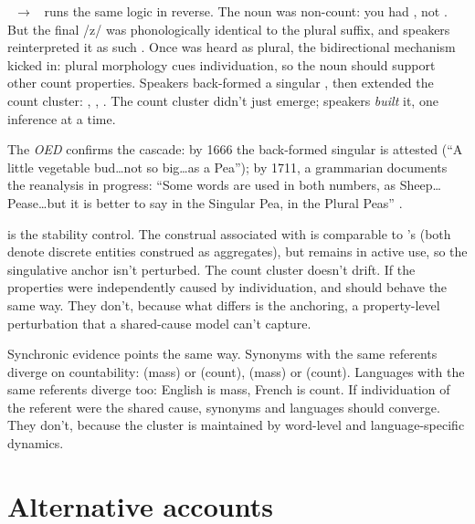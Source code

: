 \documentclass[12pt,a4paper]{article}
\begin{document}
~$\to$~ runs the same logic in reverse. The noun was non-count: you had , not . But the final /z/ was phonologically identical to the plural suffix, and speakers reinterpreted it as such \citep[s.v.\ , \textit{n.\textsuperscript{1}}]{oed}. Once  was heard as plural, the bidirectional mechanism kicked in: plural morphology cues individuation, so the noun should support other count properties. Speakers back-formed a singular , then extended the count cluster: , , . The count cluster didn't just emerge; speakers \textit{built} it, one inference at a time.

The \textit{OED} confirms the cascade: by 1666 the back-formed singular is attested (\enquote{A little vegetable bud\ldots not so big\ldots as a Pea}); by 1711, a grammarian documents the reanalysis in progress: \enquote{Some words are used in both numbers, as Sheep\ldots Pease\ldots but it is better to say in the Singular Pea, in the Plural Peas} \citep[p.~49]{greenwood1711}.

 is the stability control. The construal associated with  is comparable to 's (both denote discrete entities construed as aggregates), but  remains in active use, so the singulative anchor isn't perturbed. The count cluster doesn't drift. If the properties were independently caused by individuation,  and  should behave the same way. They don't, because what differs is the anchoring, a property-level perturbation that a shared-cause model can't capture.

Synchronic evidence points the same way. Synonyms with the same referents diverge on countability:  (mass) or  (count),  (mass) or  (count). Languages with the same referents diverge too: English  is mass, French  is count. If individuation of the referent were the shared cause, synonyms and languages should converge. They don't, because the cluster is maintained by word-level and language-specific dynamics.

\section{Alternative accounts}\label{sec:alternatives}
\end{document}

